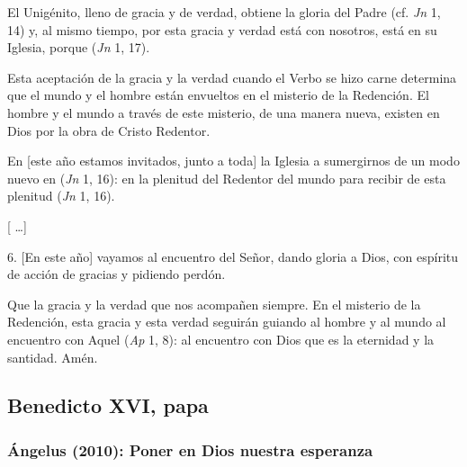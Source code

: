 \begin{body}
					El Unigénito, lleno de gracia y de verdad, obtiene la gloria del Padre (cf. \emph{Jn} 1, 14) y, al mismo tiempo, por esta gracia y verdad está con nosotros, está en su Iglesia, porque  (\emph{Jn} 1, 17).
					
					Esta aceptación de la gracia y la verdad cuando el Verbo se hizo carne determina que el mundo y el hombre están envueltos en el misterio de la Redención. El hombre y el mundo a través de este misterio, de una manera nueva, existen en Dios por la obra de Cristo Redentor.
					
					En {[}este año estamos invitados, junto a toda{]} la Iglesia a sumergirnos de un modo nuevo en  (\emph{Jn} 1, 16): en la plenitud del Redentor del mundo para recibir de esta plenitud  (\emph{Jn} 1, 16).
					
					{[} \ldots{}{]}
					
					6. {[}En este año{]} vayamos al encuentro del Señor, dando gloria a Dios, con espíritu de acción de gracias y pidiendo perdón.
					
					Que la gracia y la verdad que  nos acompañen siempre. En el misterio de la Redención, esta gracia y esta verdad seguirán guiando al hombre y al mundo al encuentro con Aquel  (\emph{Ap} 1, 8): al encuentro con Dios que es la eternidad y la santidad. Amén.
				\end{body}

\newsection

		\subsection{Benedicto XVI, papa}
		
			\subsubsection{Ángelus (2010): Poner en Dios nuestra esperanza}
			
				
